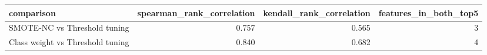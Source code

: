 \begin{tabular}{lrrr}
\toprule
comparison & spearman_rank_correlation & kendall_rank_correlation & features_in_both_top5 \\
\midrule
SMOTE-NC vs Threshold tuning & 0.757 & 0.565 & 3 \\
Class weight vs Threshold tuning & 0.840 & 0.682 & 4 \\
\bottomrule
\end{tabular}
